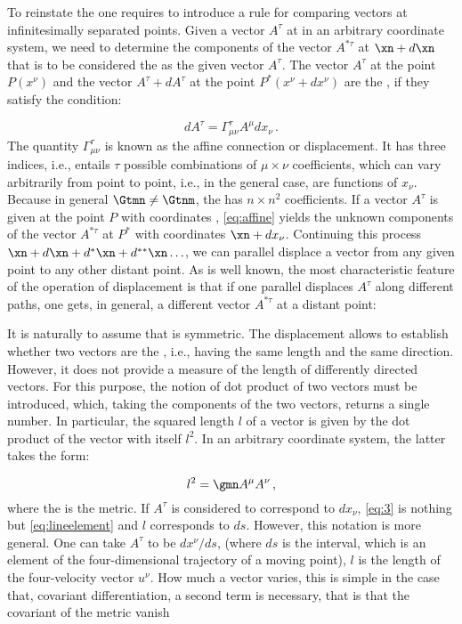 To reinstate the  one requires to introduce a rule for comparing vectors at infinitesimally separated points. Given a vector $A^\tau$ at \xn in an arbitrary coordinate system, we need to determine the components of the vector $A^{\ast\tau}$ at $\xn+d\xn$ that is to be considered the  as the given vector $A^\tau$. The vector $A^{\tau}$ at the point $P\left(x^{\nu}\right)$ and the vector $A^{\tau}+d A^{\tau}$ at the point $P^{\ast}\left(x^{\nu}+d x^{\nu}\right)$ are the , if they satisfy the condition:

\begin{equation}\label{eq:affine}
dA^\tau = \Gamma^\tau_{\mu\nu}A^{\mu} dx_\nu\,.
\end{equation}
%
The quantity $\Gamma^\tau_{\mu\nu}$ is known as the affine connection or displacement. It has three indices, i.e., entails $\tau$ possible combinations of $\mu \times \nu$ coefficients, which can vary arbitrarily from point to point, i.e., in the general case, are functions of $x_\nu$. Because in general $\Gtmn \neq \Gtnm$, the \Gtmn has $n \times n^2$ coefficients. If a vector $A^\tau$ is given at the point $P$ with coordinates \xn, \cref{eq:affine} yields the unknown components of the vector $A^{\ast\tau}$ at $P^*$ with coordinates $\xn+dx_\nu$. Continuing this process $
\xn+d\xn+d^{\ast} \xn+d^{\ast \ast} \xn \ldots$, we can parallel displace a vector from any given point to any other distant point. As is well known, the most characteristic feature of the operation of displacement is that if one parallel displaces $A^\tau$ along different paths, one gets, in general, a different vector $A^{\ast \tau}$ at a distant point:

It is naturally to assume that is symmetric. The displacement allows to establish whether two vectors are the , i.e., having the same length and the same direction. However, it does not provide a measure of the length of differently directed vectors. For this purpose, the notion of dot product of two vectors must be introduced, which, taking the components of the two vectors, returns a single number. In particular, the squared length $l$ of a vector is given by the dot product of the vector with itself $l^2$. In an arbitrary coordinate system, the latter takes the form:

\begin{equation}\label{eq:3}
l^2=\gmn A^\mu A^\nu\,,
\end{equation}
%
where the \gmn is the metric. If $A^\tau$ is considered to correspond to $dx_\nu$, \cref{eq:3} is nothing but \cref{eq:lineelement} and $l$ corresponds to $ds$. However, this notation is more general. One can take $A^\tau$ to be $dx^\nu/ds$, (where $ds$ is the \til interval, which is an element of the four-dimensional trajectory of a moving point), $l$ is the length of the four-velocity vector $u^\nu$. How much a vector varies, this is simple in the case that, covariant differentiation, a second term is necessary, that is that the covariant of the metric vanish



